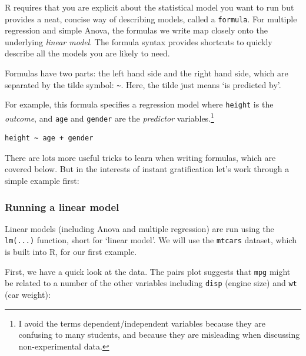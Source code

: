 \documentclass[]{article}
\newenvironment{Shaded}{\begin{snugshade}}{\end{snugshade}}
\newcommand{\KeywordTok}[1]{\textcolor[rgb]{0.13,0.29,0.53}{\textbf{#1}}}
\newcommand{\StringTok}[1]{\textcolor[rgb]{0.31,0.60,0.02}{#1}}
\newcommand{\OperatorTok}[1]{\textcolor[rgb]{0.81,0.36,0.00}{\textbf{#1}}}
\newcommand{\NormalTok}[1]{#1}
\let\rmarkdownfootnote\footnote%
\def\footnote{\protect\rmarkdownfootnote}
\theoremstyle{definition}
\theoremstyle{definition}
\theoremstyle{definition}
\theoremstyle{remark}
\begin{document}
R requires that you are explicit about the statistical model you want to
run but provides a neat, concise way of describing models, called a
\texttt{formula}. For multiple regression and simple Anova, the formulas
we write map closely onto the underlying \emph{linear model}. The
formula syntax provides shortcuts to quickly describe all the models you
are likely to need.

Formulas have two parts: the left hand side and the right hand side,
which are separated by the tilde symbol: \texttt{\textasciitilde{}}.
Here, the tilde just means `is predicted by'.

For example, this formula specifies a regression model where
\texttt{height} is the \emph{outcome}, and \texttt{age} and
\texttt{gender} are the \emph{predictor} variables.\footnote{I avoid the
  terms dependent/independent variables because they are confusing to
  many students, and because they are misleading when discussing
  non-experimental data.}

\begin{verbatim}
height ~ age + gender
\end{verbatim}

There are lots more useful tricks to learn when writing formulas, which
are covered below. But in the interests of instant gratification let's
work through a simple example first:

\subsubsection*{Running a linear model}\label{running-a-linear-model}

Linear models (including Anova and multiple regression) are run using
the \texttt{lm(...)} function, short for `linear model'. We will use the
\texttt{mtcars} dataset, which is built into R, for our first example.

First, we have a quick look at the data. The pairs plot suggests that
\texttt{mpg} might be related to a number of the other variables
including \texttt{disp} (engine size) and \texttt{wt} (car weight):

\begin{Shaded}
\end{Shaded}
\end{document}
